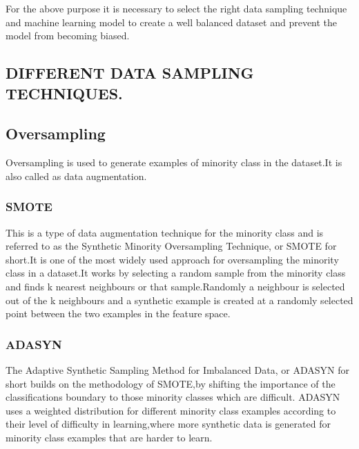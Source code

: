 \documentclass[a4paper, 12pt]{article}
\begin{document}
\hspace{1.5cm} For the above purpose it is necessary to select the right data sampling technique and machine learning model to create a well balanced dataset and prevent the model from becoming biased.

\newpage
\begin{center}
\section{DIFFERENT DATA SAMPLING TECHNIQUES.}
\end{center}
\subsection{Oversampling}
\par 
\hspace{1cm}
Oversampling is used to generate examples of minority class in the dataset.It is also called as data augmentation.
\par
\subsubsection{SMOTE}
\hspace{1cm}
This is a type of data augmentation technique for the minority class and is referred to as the Synthetic Minority Oversampling Technique, or SMOTE for short.It is one of the most widely used approach for oversampling the minority class in a dataset.It works by selecting a random sample from the minority class and finds k nearest neighbours or that sample.Randomly a neighbour is selected out of the k neighbours and a synthetic example is created at a randomly selected point between the two examples in the feature space.
\par
\subsubsection{ADASYN}
\hspace{1cm}
The Adaptive Synthetic Sampling Method for Imbalanced Data, or ADASYN for short builds on the methodology of SMOTE,by shifting the importance of the classifications boundary to those minority classes which are difficult. ADASYN uses a weighted distribution for different minority class examples according to their level of difficulty in learning,where more synthetic data is generated for minority class examples that are harder to learn.
\end{document}
